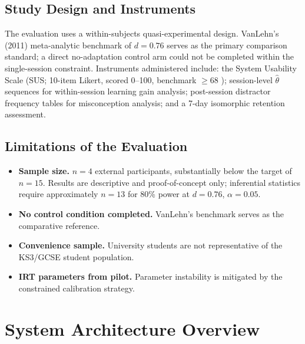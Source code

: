 \subsection{Study Design and Instruments}
\label{subsec:meth_study}

The evaluation uses a within-subjects quasi-experimental design. VanLehn's
(2011) meta-analytic benchmark of $d = 0.76$ serves as the primary comparison
standard; a direct no-adaptation control arm could not be completed within the
single-session constraint. Instruments administered include: the System Usability
Scale (SUS; 10-item Likert, scored 0--100, benchmark $\geq 68$
\parencite{bangor2008}); session-level $\hat{\theta}$ sequences for within-session
learning gain analysis; post-session distractor frequency tables for misconception
analysis; and a 7-day isomorphic retention assessment.

\subsection{Limitations of the Evaluation}
\label{subsec:meth_limitations}

\begin{itemize}[leftmargin=2em]
  \item \textbf{Sample size.} $n = 4$ external participants, substantially below
        the target of $n = 15$. Results are descriptive and proof-of-concept only;
        inferential statistics require approximately $n = 13$ for 80\% power at
        $d = 0.76$, $\alpha = 0.05$.
  \item \textbf{No control condition completed.} VanLehn's benchmark serves as
        the comparative reference.
  \item \textbf{Convenience sample.} University students are not representative
        of the KS3/GCSE student population.
  \item \textbf{IRT parameters from pilot.} Parameter instability is mitigated
        by the constrained calibration strategy.
\end{itemize}

\section{System Architecture Overview}
\label{sec:meth_architecture}

